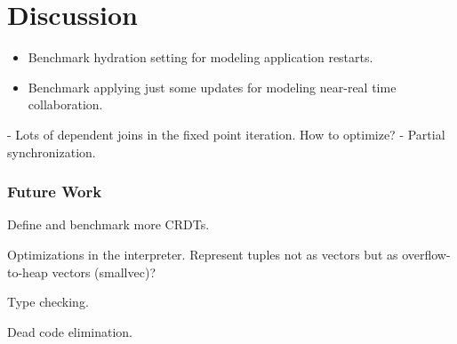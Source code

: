 
\chapter{Discussion}\label{ch:discussion}

\begin{itemize}
	\item Benchmark hydration setting for modeling application restarts.
	\item Benchmark applying just some updates for modeling near-real time collaboration.
\end{itemize}

- Lots of dependent joins in the fixed point iteration. How to optimize?
- Partial synchronization.

\subsection{Future Work}

Define and benchmark more CRDTs.

Optimizations in the interpreter. Represent tuples not as vectors but
as overflow-to-heap vectors (smallvec)?

Type checking.

Dead code elimination.
